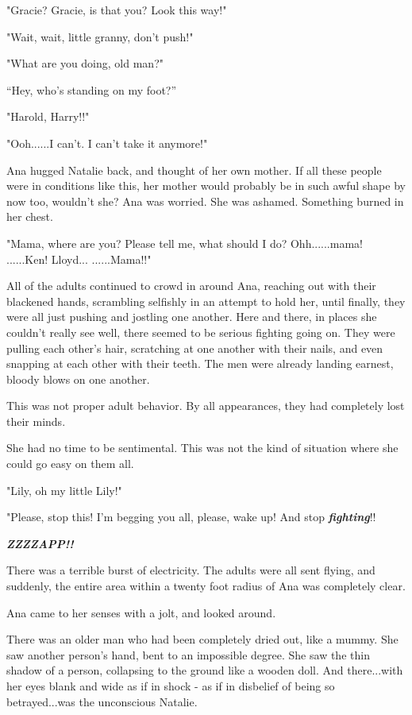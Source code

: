 \documentclass[
]{article}
\begin{document}
"Gracie? Gracie, is that you? Look this way!"

"Wait, wait, little granny, don't push!"

"What are you doing, old man?"

``Hey, who's standing on my foot?''

"Harold, Harry!!"

"Ooh......I can't. I can't take it anymore!"

Ana hugged Natalie back, and thought of her own mother. If all these
people were in conditions like this, her mother would probably be in
such awful shape by now too, wouldn't she? Ana was worried. She was
ashamed. Something burned in her chest.

"Mama, where are you? Please tell me, what should I do? Ohh......mama!
......Ken! Lloyd... ......Mama!!"

All of the adults continued to crowd in around Ana, reaching out with
their blackened hands, scrambling selfishly in an attempt to hold her,
until finally, they were all just pushing and jostling one another. Here
and there, in places she couldn't really see well, there seemed to be
serious fighting going on. They were pulling each other's hair,
scratching at one another with their nails, and even snapping at each
other with their teeth. The men were already landing earnest, bloody
blows on one another.

This was not proper adult behavior. By all appearances, they had
completely lost their minds.

She had no time to be sentimental. This was not the kind of situation
where she could go easy on them all.

"Lily, oh my little Lily!"

"Please, stop this! I'm begging you all, please, wake up! And stop
\emph{\textbf{fighting}}!!

\emph{\textbf{ZZZZAPP!!}}

There was a terrible burst of electricity. The adults were all sent
flying, and suddenly, the entire area within a twenty foot radius of Ana
was completely clear.

Ana came to her senses with a jolt, and looked around.

There was an older man who had been completely dried out, like a mummy.
She saw another person's hand, bent to an impossible degree. She saw the
thin shadow of a person, collapsing to the ground like a wooden doll.
And there...with her eyes blank and wide as if in shock - as if in
disbelief of being so betrayed...was the unconscious Natalie.
\end{document}
